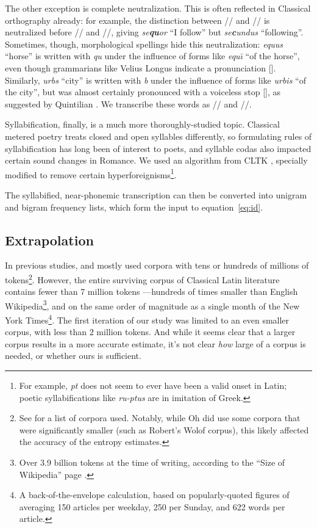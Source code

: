 \documentclass[12pt,twoside]{article}
\newcommand{\ipa}[1]{/\textipa{#1}/}
\newcommand{\ipab}[1]{[\textipa{#1}]}
\begin{document}
The other exception is complete neutralization. This is often reflected in Classical orthography already: for example, the distinction between \ipa{k} and \ipa{k\super{w}} is neutralized before \ipa{u} and \ipa{u:}, giving \emph{se\textbf{qu}or} ``I follow'' but \emph{se\textbf{c}undus} ``following''. Sometimes, though, morphological spellings hide this neutralization: \emph{equus} ``horse'' is written with \emph{qu} under the influence of forms like \emph{equ\=\i} ``of the horse'', even though grammarians like Velius Longus \citep[59.2-8]{longus} indicate a pronunciation \ipab{ekus}. Similarly, \emph{urbs} ``city'' is written with \emph{b} under the influence of forms like \emph{urbis} ``of the city'', but was almost certainly pronounced with a voiceless stop \ipab{urps}, as suggested by Quintilian \citep[I.7.7]{quintilian}. We transcribe these words as \ipa{ekus} and \ipa{urps}.

Syllabification, finally, is a much more thoroughly-studied topic. Classical metered poetry treats closed and open syllables differently, so formulating rules of syllabification has long been of interest to poets, and syllable codas also impacted certain sound changes in Romance. We used an algorithm from CLTK \citep{cltk}, specially modified to remove certain hyperforeignisms\footnote{For example, \emph{pt} does not seem to ever have been a valid onset in Latin; poetic syllabifications like \emph{ru-ptus} are in imitation of Greek.}.

The syllabified, near-phonemic transcription can then be converted into unigram and bigram frequency lists, which form the input to equation~\ref{eq:id}.

\subsection{Extrapolation}

In previous studies, \citet{coupé} and \citet{oh} mostly used corpora with tens or hundreds of millions of tokens\footnote{See \cite[30-31]{oh} for a list of corpora used. Notably, while Oh did use some corpora that were significantly smaller (such as Robert's Wolof corpus), this likely affected the accuracy of the entropy estimates.}. However, the entire surviving corpus of Classical Latin literature contains fewer than 7 million tokens \citep{phi}---hundreds of times smaller than English Wikipedia\footnote{Over 3.9 billion tokens at the time of writing, according to the ``Size of Wikipedia'' page \citep{wiki}.}, and on the same order of magnitude as a single month of the New York Times\footnote{A back-of-the-envelope calculation, based on popularly-quoted figures of averaging 150 articles per weekday, 250 per Sunday, and 622 words per article.}. The first iteration of our study was limited to an even smaller corpus, with less than 2 million tokens. And while it seems clear that a larger corpus results in a more accurate estimate, it's not clear \emph{how} large of a corpus is needed, or whether ours is sufficient.
\end{document}
